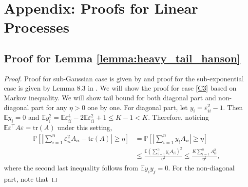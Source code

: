\section{Appendix: Proofs for Linear Processes}\label{Appendix:proof_heavytail}
\subsection{Proof for Lemma \ref{lemma:heavy_tail_hanson}}
\begin{proof}
Proof for sub-Gaussian case is given by \cite{rudelson2013hanson} and proof for the  sub-exponential case is given by Lemma 8.3 in \cite{erdHos2012bulk}. We will show the proof for case \eqref{C3} based on Markov inequality. We will show tail bound for both  diagonal part and non-diagonal part for any $\eta > 0$ 
one by one. For diagonal part,  let $y_i = \varepsilon^2_{ii}-1$. Then 
$\mathbb{E}y_i = 0$ and $\mathbb{E}y^2_i = \mathbb{E}\varepsilon^4_{ii} - 2\mathbb{E}\varepsilon^2_{ii}+1 \le   K-1< K$. 
Therefore, noticing  $\mathbb{E}\varepsilon^\top A\varepsilon = \text{tr}(A)$ under this setting,
\begin{equation*}
\begin{aligned}
\mathbb{P}\left[\left|\sum_{i=1}^n \varepsilon^2_{ii} A_{ii} - \text{tr}(A)\right|\ge \eta\right] &= \mathbb{P}\left[\left|\sum_{i=1}^n y_iA_{ii}\right|\ge \eta\right]\\
&\le \frac{\mathbb{E}(\sum_{i=1}^n y_iA_{ii})^2}{\eta^2} \le \frac{K\sum_{i=1}^n A^2_{ii}}{\eta^2}, 
\end{aligned}
\end{equation*}
where the second last inequality follows from  $\mathbb{E} y_iy_j = 0$. 
For the non-diagonal part, note that 


\end{proof}
